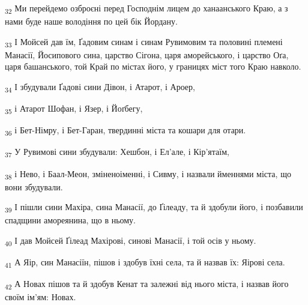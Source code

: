 \begin{tcolorbox}
\textsubscript{32} Ми перейдемо озброєні перед Господнім лицем до ханаанського Краю, а з нами буде наше володіння по цей бік Йордану.
\end{tcolorbox}
\begin{tcolorbox}
\textsubscript{33} І Мойсей дав їм, Ґадовим синам і синам Рувимовим та половині племені Манасії, Йосипового сина, царство Сігона, царя аморейського, і царство Оґа, царя башанського, той Край по містах його, у границях міст того Краю навколо.
\end{tcolorbox}
\begin{tcolorbox}
\textsubscript{34} І збудували Ґадові сини Дівон, і Атарот, і Ароер,
\end{tcolorbox}
\begin{tcolorbox}
\textsubscript{35} і Атарот Шофан, і Язер, і Йоґбегу,
\end{tcolorbox}
\begin{tcolorbox}
\textsubscript{36} і Бет-Німру, і Бет-Гаран, твердинні міста та кошари для отари.
\end{tcolorbox}
\begin{tcolorbox}
\textsubscript{37} У Рувимові сини збудували: Хешбон, і Ел'але, і Кір'ятаїм,
\end{tcolorbox}
\begin{tcolorbox}
\textsubscript{38} і Нево, і Баал-Меон, зміненоіменні, і Сивму, і назвали йменнями міста, що вони збудували.
\end{tcolorbox}
\begin{tcolorbox}
\textsubscript{39} І пішли сини Махіра, сина Манасії, до Ґілеаду, та й здобули його, і позбавили спадщини амореянина, що в ньому.
\end{tcolorbox}
\begin{tcolorbox}
\textsubscript{40} І дав Мойсей Ґілеад Махірові, синові Манасії, і той осів у ньому.
\end{tcolorbox}
\begin{tcolorbox}
\textsubscript{41} А Яір, син Манасіїн, пішов і здобув їхні села, та й назвав їх: Яірові села.
\end{tcolorbox}
\begin{tcolorbox}
\textsubscript{42} А Новах пішов та й здобув Кенат та залежні від нього міста, і назвав його своїм ім'ям: Новах.
\end{tcolorbox}
